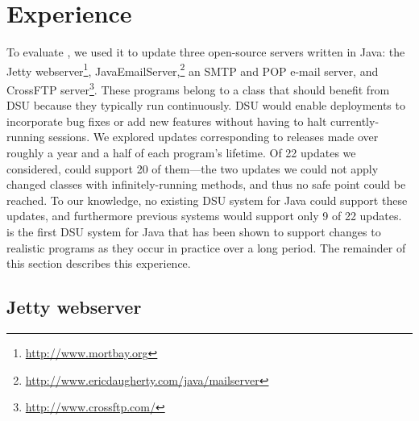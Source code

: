 
\section{Experience}
\label{sec:experience}


To evaluate \DSU, we used it to update three open-source servers written
in Java: the Jetty webserver\footnote{\url{http://www.mortbay.org}},
JavaEmailServer,\footnote{\url{http://www.ericdaugherty.com/java/mailserver}}
an SMTP and POP e-mail server, and CrossFTP server\footnote{\url{http://www.crossftp.com/}}.
These programs belong to a class that
should benefit from DSU because they typically run continuously. DSU
would enable deployments to incorporate bug fixes or add new features
without having to halt currently-running sessions.  We explored
updates corresponding to releases made over roughly a year and a half
of each program's lifetime.  Of 22 updates we considered, \DSU{} could
support 20 of them---the two updates we could not apply changed
classes with infinitely-running methods, and thus no safe point could
be reached.  To our knowledge, no existing DSU system
for Java could support these updates, and furthermore previous systems
would support only 9 of 22 updates.  \DSU{} is the first DSU system for Java
that has been shown to support changes to realistic programs as they
occur in practice over a long period.  The remainder of this section
describes this experience.

\subsection{Jetty webserver}
\label{subsec:jetty}

